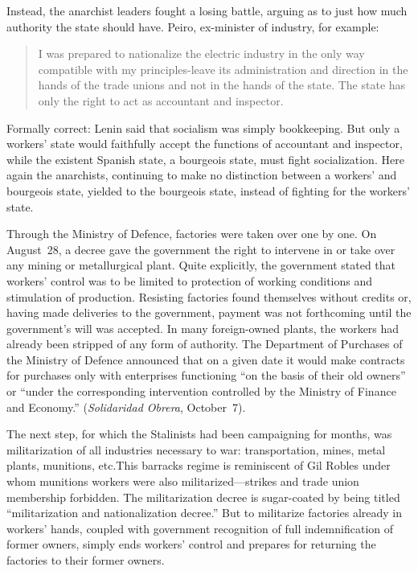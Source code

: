 Instead, the anarchist leaders fought a losing battle, arguing as to just how much authority the state should have. Peiro, ex-minister of industry, for example:

\vspace{-0.5\baselineskip}

\begin{quotation}
  I was prepared to nationalize the electric industry in the only way compatible with my principles-leave its administration and direction in the hands of the trade unions and not in the hands of the state. The state has only the right to act as accountant and inspector.
\end{quotation}

Formally correct: Lenin said that socialism was simply bookkeeping. But only a workers’ state would faithfully accept the functions of accountant and inspector, while the existent Spanish state, a bourgeois state, must fight socialization. Here again the anarchists, continuing to make no distinction between a workers’ and bourgeois state, yielded to the bourgeois state, instead of fighting for the workers’ state.

Through the Ministry of Defence, factories were taken over one by one. On August~28, a decree gave the government the right to intervene in or take over any mining or metallurgical plant. Quite explicitly, the government stated that workers’ control was to be limited to protection of working conditions and stimulation of production. Resisting factories found themselves without credits or, having made deliveries to the government, payment was not forthcoming until the government’s will was accepted. In many foreign-owned plants, the workers had already been stripped of any form of authority. The Department of Purchases of the Ministry of Defence announced that on a given date it would make contracts for purchases only with enterprises functioning ``on the basis of their old owners'' or ``under the corresponding intervention controlled by the Ministry of Finance and Economy.'' (\emph{Solidaridad Obrera}, October~7).

The next step, for which the Stalinists had been campaigning for months, was militarization of all industries necessary to war: transportation, mines, metal plants, munitions, etc.\@ This barracks regime is reminiscent of Gil Robles under whom munitions workers were also militarized---strikes and trade union membership forbidden. The militarization decree is sugar-coated by being titled ``militarization and nationalization decree.'' But to militarize factories already in workers’ hands, coupled with government recognition of full indemnification of former owners, simply ends workers’ control and prepares for returning the factories to their former owners.

